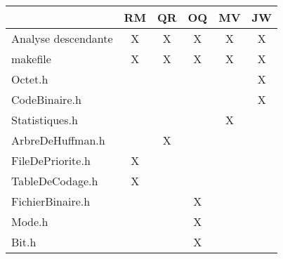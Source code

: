 \begin{table}[h]
\centering
\begin{tabular}{l|c|c|c|c|c|}

\cline{2-6}
                                                        & RM & QR & OQ & MV & JW \\ \hline
\multicolumn{1}{|l|}{Analyse descendante}               & X                     & X              & X                     & X                     & X                      \\ \hline
\multicolumn{1}{|l|}{makefile}                          & X                      & X              & X                     & X                     & X                      \\ \hline
\multicolumn{1}{|l|}{Octet.h}                         &                       &                &                      &                       & X                       \\ \hline
\multicolumn{1}{|l|}{CodeBinaire.h}                            &                       &                &                      &                       & X                     \\ \hline
\multicolumn{1}{|l|}{Statistiques.h}                        &                      &                &                       & X                       &                        \\ \hline
\multicolumn{1}{|l|}{ArbreDeHuffman.h}                            &                       & X              &                       &                       &                        \\ \hline
\multicolumn{1}{|l|}{FileDePriorite.h}                           & X                       &               &                       &                       &                        \\ \hline
\multicolumn{1}{|l|}{TableDeCodage.h}                         & X                       &                &                       &                       &                        \\ \hline
\multicolumn{1}{|l|}{FichierBinaire.h}       &                      &                & X                      &                       &                        \\ \hline
\multicolumn{1}{|l|}{Mode.h}           &                       &                & X                     &                       &                        \\ \hline
\multicolumn{1}{|l|}{Bit.h}               &                       &               & X                    &                       &                        \\ \hline

\end{tabular}
\end{table}
